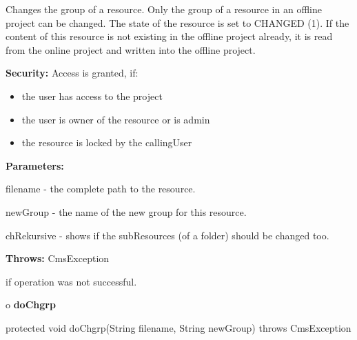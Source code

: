 \begin{description}
\htmlDD Changes the group of a resource. \htmlBR
Only the group of a resource in an offline project can be changed. The state
of the resource is set to CHANGED (1). If the content of this resource is not
existing in the offline project already, it is read from the online project
and written into the offline project. 

{\bf Security:} Access is granted, if: 

\begin{itemize}
\item the user has access to the project 
\item the user is owner of the resource or is admin 
\item the resource is locked by the callingUser 
\end{itemize}

\begin{description}
\item {\bf Parameters:}  

filename - the complete path to the resource.  

newGroup - the name of the new group for this resource.  

chRekursive - shows if the subResources (of a folder) should be changed too.  
\item {\bf Throws:} CmsException  

if operation was not successful.  
\end{description}

\end{description}

o {\bf doChgrp} 

\begin{PRE}
 protected void doChgrp(String filename,
                        String newGroup) throws CmsException
\end{PRE}

